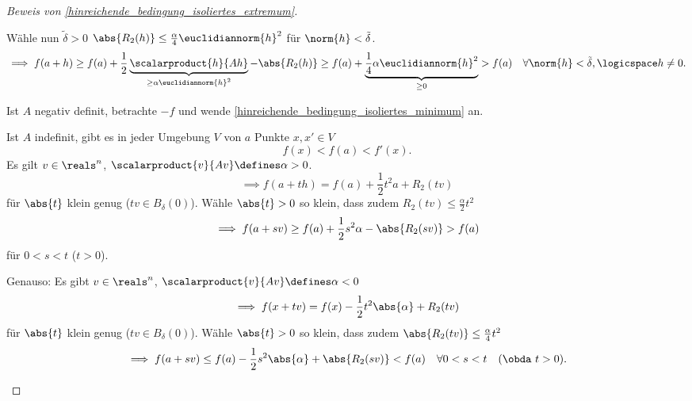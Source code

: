 \begin{proof}[Beweis von \ref{hinreichende_bedingung_isoliertes_extremum}]
\begin{proofdescription}
    Wähle nun \( \tilde{\delta}>0 \) \sd \( \abs{R_2(h)}\leq \frac{\alpha}{4}\euclidiannorm{h}^2 \) für \( \norm{h}<\tilde{\delta} \).
    \begin{equation*}
      \implies f(a+h)\geq f(a)+\frac{1}{2}\underbrace{\scalarproduct{h}{Ah}}_{\geq \alpha\euclidiannorm{h}^2}-\abs{R_2(h)}\geq f(a)+\underbrace{\frac{1}{4}\alpha\euclidiannorm{h}^2}_{\geq 0}>f(a)\quad \forall \norm{h}<\tilde{\delta},\logicspace  h\neq 0.
    \end{equation*}
    \item[\ref{hinreichende_bedingung_isoliertes_maximum}] Ist \( A \) negativ definit, betrachte \( -f \) und wende \ref{hinreichende_bedingung_isoliertes_minimum} an.
    \item[\ref{hinreichende_bedingung_kein_extremum}] Ist \( A \) indefinit, gibt es in jeder Umgebung \( V \) von \( a \) Punkte \( x,x'\in V \) \sd 
    \begin{equation*}
      f(x)<f(a)<f'(x).
    \end{equation*}
    Es gilt \( v\in \reals^n \), \sd \( \scalarproduct{v}{Av}\defines \alpha >0 \).
    \begin{equation*}
      \implies f(a+th)= f(a)+\frac{1}{2}t^2 a+R_2(tv)
    \end{equation*}
    für \( \abs{t} \) klein genug (\sd \( tv\in B_{\delta}(0) \)). Wähle \( \abs{t}>0 \) so klein, dass zudem \( R_2(tv)\leq \frac{\alpha}{2}t^2 \)
    \begin{equation*}
      \implies f(a+sv)\geq f(a)+\frac{1}{2}s^2\alpha-\abs{R_2(sv)}>f(a)
    \end{equation*}
    für \( 0<s<t \) (\obda \( t>0 \)). 
    
    Genauso: Es gibt \( v\in \reals^n \), \sd \( \scalarproduct{v}{Av}\defines \alpha<0 \)
    \begin{equation*}
      \implies f(x+tv)=f(x)-\frac{1}{2}t^2\abs{\alpha}+R_2(tv)
    \end{equation*}
    für \( \abs{t} \) klein genug (\sd \( tv\in B_{\delta}(0) \)). Wähle \( \abs{t}>0 \) so klein, dass zudem \( \abs{R_2(tv)}\leq\frac{\alpha}{4}t^2 \)
    \begin{equation*}
      \implies f(a+sv)\leq f(a)-\frac{1}{2}s^2\abs{\alpha}+\abs{R_2(sv)}<f(a)\quad \forall 0<s<t\quad (\text{\obda }t>0).
    \end{equation*}
  \end{proofdescription}
\end{proof}
